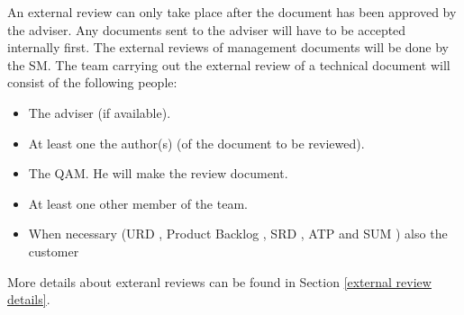 An external review can only take place after the document has been approved by the adviser. Any documents sent to the adviser will have to be accepted internally first. The external reviews of management documents will be done by the SM. The team carrying out the external review of a technical document will consist of the following people:
\begin{itemize}
\item The adviser (if available).
\item At least one the author(s) (of the document to be reviewed).
\item The QAM. He will make the review document.
\item At least one other member of the team.
\item When necessary (URD \cite{urd}, Product Backlog \cite{backlog}, SRD \cite{srd}, ATP \cite{atp} and SUM \cite{sum}) also the customer
\end{itemize}
More details about exteranl reviews can be found in Section \ref{external review details}.
